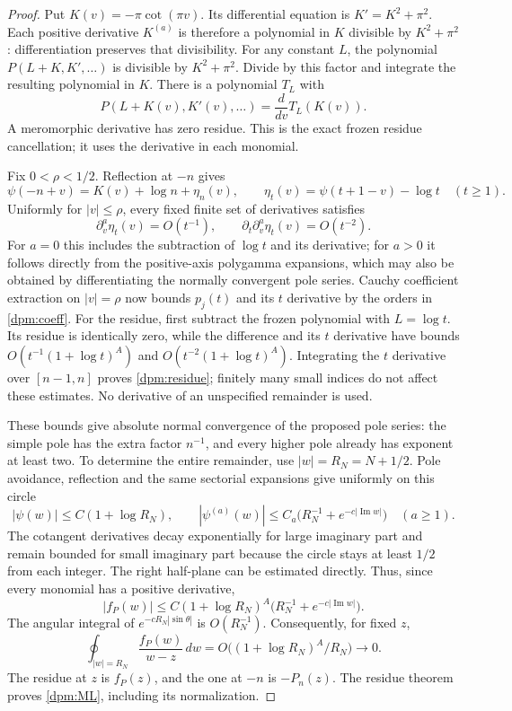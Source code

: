 \begin{proof}
Put $K(v)=-\pi\cot(\pi v)$.  Its differential equation is
$K'=K^2+\pi^2$.  Each positive derivative $K^{(a)}$ is therefore a
polynomial in $K$ divisible by $K^2+\pi^2$: differentiation preserves
that divisibility.  For any constant $L$, the polynomial
$P(L+K,K',\ldots)$ is divisible by $K^2+\pi^2$.  Divide by this
factor and integrate the resulting polynomial in $K$.  There is a
polynomial $T_L$ with
\[
 P(L+K(v),K'(v),\ldots)=\frac{d}{dv}T_L(K(v)).
\]
A meromorphic derivative has zero residue.  This is the exact frozen
residue cancellation; it uses the derivative in each monomial.

Fix $0<\rho<1/2$.  Reflection at $-n$ gives
\[
 \psi(-n+v)=K(v)+\log n+\eta_n(v),\qquad
 \eta_t(v)=\psi(t+1-v)-\log t\quad(t\ge1).
\]
Uniformly for $|v|\le\rho$, every fixed finite set of derivatives satisfies
\[
 \partial_v^a\eta_t(v)=O(t^{-1}),\qquad
 \partial_t\partial_v^a\eta_t(v)=O(t^{-2}).
\]
For $a=0$ this includes the subtraction of $\log t$ and its derivative;
for $a>0$ it follows directly from the positive-axis polygamma
expansions, which may also be obtained by differentiating the normally
convergent pole series.  Cauchy coefficient extraction on $|v|=\rho$
now bounds $p_j(t)$ and its $t$ derivative by the orders in
\eqref{dpm:coeff}.  For the residue, first subtract the frozen
polynomial with $L=\log t$.  Its residue is identically zero, while
the difference and its $t$ derivative have bounds
$O(t^{-1}(1+\log t)^A)$ and $O(t^{-2}(1+\log t)^A)$.
Integrating the $t$ derivative over $[n-1,n]$ proves
\eqref{dpm:residue}; finitely many small indices do not affect these
estimates.  No derivative of an unspecified remainder is used.

These bounds give absolute normal convergence of the proposed pole
series: the simple pole has the extra factor $n^{-1}$, and every
higher pole already has exponent at least two.  To determine the
entire remainder, use $|w|=R_N=N+1/2$.  Pole avoidance, reflection
and the same sectorial expansions give uniformly on this circle
\[
 |\psi(w)|\le C(1+\log R_N),\qquad
 |\psi^{(a)}(w)|\le C_a
       \bigl(R_N^{-1}+e^{-c|\operatorname{Im}w|}\bigr)
       \quad(a\ge1).
\]
The cotangent derivatives decay exponentially for large imaginary
part and remain bounded for small imaginary part because the circle
stays at least $1/2$ from each integer.  The right half-plane can
be estimated directly.  Thus, since every monomial has a positive
derivative,
\[
 |f_P(w)|\le C(1+\log R_N)^A
        \bigl(R_N^{-1}+e^{-c|\operatorname{Im}w|}\bigr).
\]
The angular integral of $e^{-cR_N|\sin\theta|}$ is $O(R_N^{-1})$.
Consequently, for fixed $z$,
\[
 \oint_{|w|=R_N}\frac{f_P(w)}{w-z}\,dw
       =O\bigl((1+\log R_N)^A/R_N\bigr)\longrightarrow0.
\]
The residue at $z$ is $f_P(z)$, and the one at $-n$ is $-P_n(z)$.
The residue theorem proves \eqref{dpm:ML}, including its normalization.
\end{proof}

